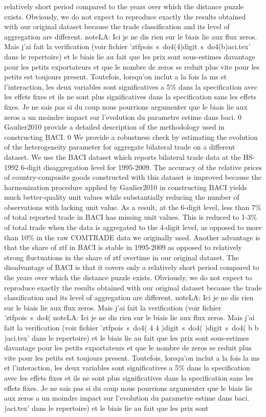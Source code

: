 \documentclass[12pt,twoside,a4paper,notitlepage]{article}
\begin{document}
{relatively short period compared to the years over which the distance puzzle exists. Obviously, we do not expect to reproduce exactly the results obtained with our original dataset because the trade classification and its level of aggregation are different. noteLA: Ici je ne dis rien sur le biais lie aux flux zeros. Mais j'ai fait la verification (voir fichier 'ztfpois\ s\ do4(4)digit\ s\ do4(b)aci.tex' dans le repertoire) et le biais lie au fait que les prix sont sous-estimes davantage pour les petits exportateurs et que le nombre de zeros se reduit plus vite pour les petits est toujours present. Toutefois, lorsqu'on inclut a la fois la ms et l'interaction, les deux variables sont significatives a 5\% dans la specification avec les effets fixes et ils ne sont plus significatives dans la specification sans les effets fixes. Je ne sais pas si du coup nous pourrions argumenter que le biais lie aux zeros a un moindre impact sur l'evolution du parametre estime dans baci. 0 Gaulier2010 provide a detailed description of the methodology used in constructing BACI. 0 We provide a robustness check by estimating the evolution of the heterogeneity parameter for aggregate bilateral trade on a different dataset. We use the BACI dataset which reports bilateral trade data at the HS-1992 6-digit disaggregation level for 1995-2009. The accuracy of the relative prices of country-composite goods constructed with this dataset is improved because the harmonization procedure applied by Gaulier2010 in constructing BACI yields much better-quality unit values while substantially reducing the number of observations with lacking unit value. As a result, at the 6-digit level, less than 7\% of total reported trade in BACI has missing unit values. This is reduced to 1-3\% of total trade when the data is aggregated to the 4-digit level, as opposed to more than 10\% in the raw COMTRADE data we originally used. Another advantage is that the share of ztf in BACI is stable in 1995-2009 as opposed to relatively strong fluctuations in the share of ztf overtime in our original dataset. The disadvantage of BACI is that it covers only a relatively short period compared to the years over which the distance puzzle exists. Obviously, we do not expect to reproduce exactly the results obtained with our original dataset because the trade classification and its level of aggregation are different. noteLA: Ici je ne dis rien sur le biais lie aux flux zeros. Mais j'ai fait la verification (voir fichier 'ztfpois\ s\ do4( noteLA: Ici je ne dis rien sur le biais lie aux flux zeros. Mais j'ai fait la verification (voir fichier 'ztfpois\ s\ do4( 4 4 )digit\ s\ do4( )digit\ s\ do4( b b )aci.tex' dans le repertoire) et le biais lie au fait que les prix sont sous-estimes davantage pour les petits exportateurs et que le nombre de zeros se reduit plus vite pour les petits est toujours present. Toutefois, lorsqu'on inclut a la fois la ms et l'interaction, les deux variables sont significatives a 5\% dans la specification avec les effets fixes et ils ne sont plus significatives dans la specification sans les effets fixes. Je ne sais pas si du coup nous pourrions argumenter que le biais lie aux zeros a un moindre impact sur l'evolution du parametre estime dans baci. )aci.tex' dans le repertoire) et le biais lie au fait que les prix sont }
\end{document}
